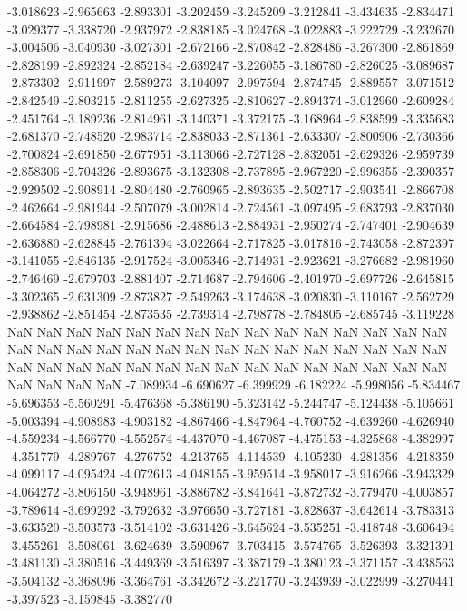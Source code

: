 -3.018623
-2.965663
-2.893301
-3.202459
-3.245209
-3.212841
-3.434635
-2.834471
-3.029377
-3.338720
-2.937972
-2.838185
-3.024768
-3.022883
-3.222729
-3.232670
-3.004506
-3.040930
-3.027301
-2.672166
-2.870842
-2.828486
-3.267300
-2.861869
-2.828199
-2.892324
-2.852184
-2.639247
-3.226055
-3.186780
-2.826025
-3.089687
-2.873302
-2.911997
-2.589273
-3.104097
-2.997594
-2.874745
-2.889557
-3.071512
-2.842549
-2.803215
-2.811255
-2.627325
-2.810627
-2.894374
-3.012960
-2.609284
-2.451764
-3.189236
-2.814961
-3.140371
-3.372175
-3.168964
-2.838599
-3.335683
-2.681370
-2.748520
-2.983714
-2.838033
-2.871361
-2.633307
-2.800906
-2.730366
-2.700824
-2.691850
-2.677951
-3.113066
-2.727128
-2.832051
-2.629326
-2.959739
-2.858306
-2.704326
-2.893675
-3.132308
-2.737895
-2.967220
-2.996355
-2.390357
-2.929502
-2.908914
-2.804480
-2.760965
-2.893635
-2.502717
-2.903541
-2.866708
-2.462664
-2.981944
-2.507079
-3.002814
-2.724561
-3.097495
-2.683793
-2.837030
-2.664584
-2.798981
-2.915686
-2.488613
-2.884931
-2.950274
-2.747401
-2.904639
-2.636880
-2.628845
-2.761394
-3.022664
-2.717825
-3.017816
-2.743058
-2.872397
-3.141055
-2.846135
-2.917524
-3.005346
-2.714931
-2.923621
-3.276682
-2.981960
-2.746469
-2.679703
-2.881407
-2.714687
-2.794606
-2.401970
-2.697726
-2.645815
-3.302365
-2.631309
-2.873827
-2.549263
-3.174638
-3.020830
-3.110167
-2.562729
-2.938862
-2.851454
-2.873535
-2.739314
-2.798778
-2.784805
-2.685745
-3.119228
NaN
NaN
NaN
NaN
NaN
NaN
NaN
NaN
NaN
NaN
NaN
NaN
NaN
NaN
NaN
NaN
NaN
NaN
NaN
NaN
NaN
NaN
NaN
NaN
NaN
NaN
NaN
NaN
NaN
NaN
NaN
NaN
NaN
NaN
NaN
NaN
NaN
NaN
NaN
NaN
NaN
NaN
NaN
NaN
NaN
NaN
NaN
NaN
NaN
-7.089934
-6.690627
-6.399929
-6.182224
-5.998056
-5.834467
-5.696353
-5.560291
-5.476368
-5.386190
-5.323142
-5.244747
-5.124438
-5.105661
-5.003394
-4.908983
-4.903182
-4.867466
-4.847964
-4.760752
-4.639260
-4.626940
-4.559234
-4.566770
-4.552574
-4.437070
-4.467087
-4.475153
-4.325868
-4.382997
-4.351779
-4.289767
-4.276752
-4.213765
-4.114539
-4.105230
-4.281356
-4.218359
-4.099117
-4.095424
-4.072613
-4.048155
-3.959514
-3.958017
-3.916266
-3.943329
-4.064272
-3.806150
-3.948961
-3.886782
-3.841641
-3.872732
-3.779470
-4.003857
-3.789614
-3.699292
-3.792632
-3.976650
-3.727181
-3.828637
-3.642614
-3.783313
-3.633520
-3.503573
-3.514102
-3.631426
-3.645624
-3.535251
-3.418748
-3.606494
-3.455261
-3.508061
-3.624639
-3.590967
-3.703415
-3.574765
-3.526393
-3.321391
-3.481130
-3.380516
-3.449369
-3.516397
-3.387179
-3.380123
-3.371157
-3.438563
-3.504132
-3.368096
-3.364761
-3.342672
-3.221770
-3.243939
-3.022999
-3.270441
-3.397523
-3.159845
-3.382770
